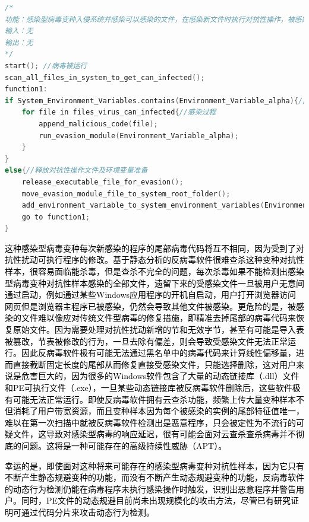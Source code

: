 \begin{lstlisting}[language=C++, caption={code for attack}, label={lst:cppfile1}]
/*
功能：感染型病毒变种入侵系统并感染可以感染的文件，在感染新文件时执行对抗性操作，被感染的新文件会受到静态规避操作的修改。
输入：无
输出：无
*/
start(); //病毒被运行  
scan_all_files_in_system_to_get_can_infected();   
function1:  
if System_Environment_Variables.contains(Environment_Variable_alpha){//检测到环境变量  
    for file in files_virus_can_infected{//感染过程  
        append_malicious_code(file);  
        run_evasion_module(Environment_Variable_alpha);  
    }  
}  
else{//释放对抗性操作文件及环境变量准备  
    release_executable_file_for_evasion();  
    move_evasion_module_file_to_system_root_folder();  
    add_environment_variable_to_system_environment_variables(Environment_Variable_alpha);  
    go to function1;  
}  

\end{lstlisting}

\textcolor{black}{这种感染型病毒变种每次新感染的程序的尾部病毒代码将互不相同，因为受到了对抗性扰动可执行程序的修改。基于静态分析的反病毒软件很难查杀这种变种对抗性样本，很容易面临能杀毒，但是查杀不完全的问题，每次杀毒如果不能检测出感染型病毒变种对抗性样本感染的全部文件，遗留下来的受感染文件一旦被用户无意间通过启动，例如通过某些Windows应用程序的开机自启动，用户打开浏览器访问网页但是浏览器主程序已被感染，仍然会导致其他文件被感染。更危险的是，被感染的文件难以像应对传统文件型病毒的修复措施，即精准去掉尾部的病毒代码来恢复原始文件。因为需要处理对抗性扰动新增的节和无效字节，甚至有可能是导入表被篡改，节表被修改的行为，一旦去除有偏差，则会导致受感染文件无法正常运行。因此反病毒软件极有可能无法通过黑名单中的病毒代码来计算线性偏移量，进而直接截断固定长度的尾部从而修复直接受感染文件，只能选择删除，这对用户来说是危害巨大的，因为很多的Windows软件包含了大量的动态链接库（.dll）文件和PE可执行文件（.exe），一旦某些动态链接库被反病毒软件删除后，这些软件极有可能无法正常运行。即使反病毒软件拥有云查杀功能，频繁上传大量变种样本不但消耗了用户带宽资源，而且变种样本因为每个被感染的实例的尾部特征值唯一，难以在第一次扫描中就被反病毒软件检测出是恶意程序，只会被定性为不流行的可疑文件，这导致对感染型病毒的响应延迟，很有可能会面对云查杀查杀病毒并不彻底的问题。这将是一种可能存在的高级持续性威胁（APT）。}

\textcolor{black}{幸运的是，即使面对这种将来可能存在的感染型病毒变种对抗性样本，因为它只有不断产生静态规避变种的功能，而没有不断产生动态规避变种的功能，反病毒软件的动态行为检测仍能在病毒程序未执行感染操作时触发，识别出恶意程序并警告用户。同时，PE文件的动态规避目前尚未出现规模化的攻击方法，尽管已有研究证明可通过代码分片来攻击动态行为检测\cite{ref38}\cite{ref39}\cite{ref40}。}

